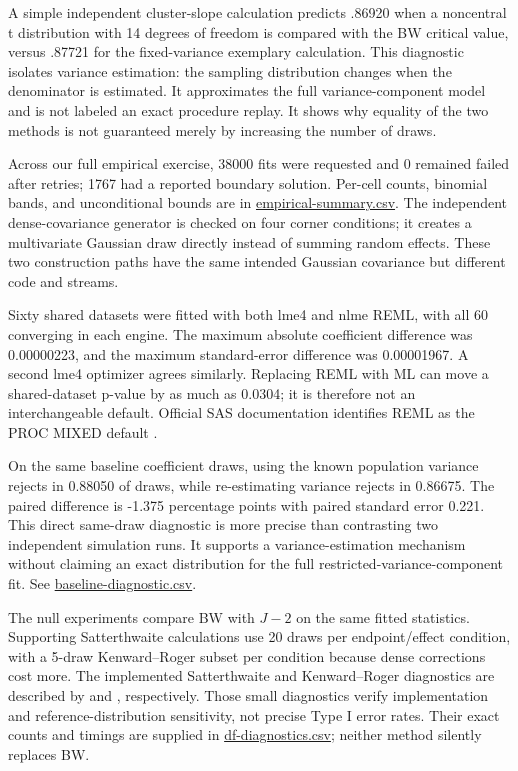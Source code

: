 \documentclass[11pt]{article}
\begin{document}
A simple independent cluster-slope calculation predicts .86920 when a noncentral t distribution with 14 degrees of freedom is compared with the BW critical value, versus .87721 for the fixed-variance exemplary calculation. This diagnostic isolates variance estimation: the sampling distribution changes when the denominator is estimated. It approximates the full variance-component model and is not labeled an exact procedure replay. It shows why equality of the two methods is not guaranteed merely by increasing the number of draws.

Across our full empirical exercise, 38000 fits were requested and 0 remained failed after retries; 1767 had a reported boundary solution. Per-cell counts, binomial bands, and unconditional bounds are in \href{https://github.com/alectionary/vibe-math/blob/master/formalization/kupzyk-power-assumptions/outputs/empirical-summary.csv}{empirical-summary.csv}. The independent dense-covariance generator is checked on four corner conditions; it creates a multivariate Gaussian draw directly instead of summing random effects. These two construction paths have the same intended Gaussian covariance but different code and streams.

Sixty shared datasets were fitted with both lme4 \citep{bates2015} and nlme \citep{nlme2025} REML, with all 60 converging in each engine. The maximum absolute coefficient difference was 0.00000223, and the maximum standard-error difference was 0.00001967. A second lme4 optimizer agrees similarly. Replacing REML with ML can move a shared-dataset p-value by as much as 0.0304; it is therefore not an interchangeable default. Official SAS documentation identifies REML as the PROC MIXED default \citep[METHOD option]{sasreml}.

On the same baseline coefficient draws, using the known population variance rejects in 0.88050 of draws, while re-estimating variance rejects in 0.86675. The paired difference is -1.375 percentage points with paired standard error 0.221. This direct same-draw diagnostic is more precise than contrasting two independent simulation runs. It supports a variance-estimation mechanism without claiming an exact distribution for the full restricted-variance-component fit. See \href{https://github.com/alectionary/vibe-math/blob/master/formalization/kupzyk-power-assumptions/outputs/baseline-diagnostic.csv}{baseline-diagnostic.csv}.

The null experiments compare BW with $J-2$ on the same fitted statistics. Supporting Satterthwaite calculations use 20 draws per endpoint/effect condition, with a 5-draw Kenward--Roger subset per condition because dense corrections cost more. The implemented Satterthwaite and Kenward--Roger diagnostics are described by \citet{kuznetsova2017} and \citet{halekoh2014}, respectively. Those small diagnostics verify implementation and reference-distribution sensitivity, not precise Type I error rates. Their exact counts and timings are supplied in \href{https://github.com/alectionary/vibe-math/blob/master/formalization/kupzyk-power-assumptions/outputs/df-diagnostics.csv}{df-diagnostics.csv}; neither method silently replaces BW.
\end{document}
